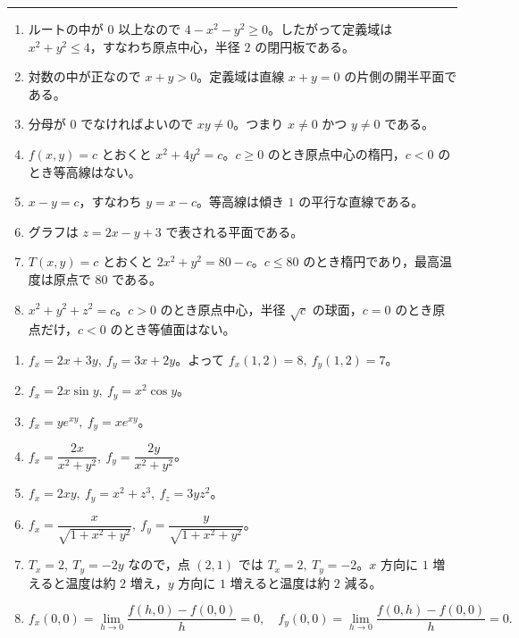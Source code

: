 \documentclass[dvipdfmx,a4paper,12pt]{jsarticle}
\newcommand{\chap}[1]{\vspace{1.0em}{\Large #1}\par\vspace{0.25em}\hrule\vspace{0.55em}}
\newcommand{\subchap}[1]{\vspace{0.7em}{\large #1}\par\vspace{0.15em}}
\begin{document}
\newpage
\chap{演習問題の解答}

\subchap{A. 定義域・グラフ・等高線}

\begin{enumerate}[label=\arabic*.]
\item ルートの中が $0$ 以上なので $4-x^2-y^2\ge0$。したがって定義域は $x^2+y^2\le4$，すなわち原点中心，半径 $2$ の閉円板である。
\item 対数の中が正なので $x+y>0$。定義域は直線 $x+y=0$ の片側の開半平面である。
\item 分母が $0$ でなければよいので $xy\neq0$。つまり $x\neq0$ かつ $y\neq0$ である。
\item $f(x,y)=c$ とおくと $x^2+4y^2=c$。$c\ge0$ のとき原点中心の楕円，$c<0$ のとき等高線はない。
\item $x-y=c$，すなわち $y=x-c$。等高線は傾き $1$ の平行な直線である。
\item グラフは $z=2x-y+3$ で表される平面である。
\item $T(x,y)=c$ とおくと $2x^2+y^2=80-c$。$c\le80$ のとき楕円であり，最高温度は原点で $80$ である。
\item $x^2+y^2+z^2=c$。$c>0$ のとき原点中心，半径 $\sqrt c$ の球面，$c=0$ のとき原点だけ，$c<0$ のとき等値面はない。
\end{enumerate}

\subchap{B. 偏微分}

\begin{enumerate}[label=\arabic*.,start=9]
\item $f_x=2x+3y,\ f_y=3x+2y$。よって $f_x(1,2)=8,\ f_y(1,2)=7$。
\item $f_x=2x\sin y,\ f_y=x^2\cos y$。
\item $f_x=ye^{xy},\ f_y=xe^{xy}$。
\item $f_x=\dfrac{2x}{x^2+y^2},\ f_y=\dfrac{2y}{x^2+y^2}$。
\item $f_x=2xy,\ f_y=x^2+z^3,\ f_z=3yz^2$。
\item $f_x=\dfrac{x}{\sqrt{1+x^2+y^2}},\ f_y=\dfrac{y}{\sqrt{1+x^2+y^2}}$。
\item $T_x=2,\ T_y=-2y$ なので，点 $(2,1)$ では $T_x=2,\ T_y=-2$。$x$ 方向に $1$ 増えると温度は約 $2$ 増え，$y$ 方向に $1$ 増えると温度は約 $2$ 減る。
\item
$$
f_x(0,0)=\lim_{h\to0}\frac{f(h,0)-f(0,0)}{h}=0,\quad
f_y(0,0)=\lim_{h\to0}\frac{f(0,h)-f(0,0)}{h}=0.
$$
\end{enumerate}

\subchap{C. 可微分性・全微分・接平面}
\end{document}

